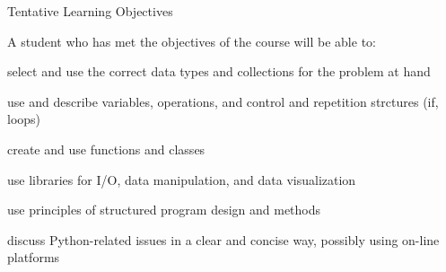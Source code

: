 \documentclass{beamer}%
\begin{document}
\begin{frame}{Tentative Learning Objectives}


A student who has met the objectives of the course will be able to:
\begin{itemize}
{\footnotesize
\item select and use the correct data types and collections for the problem at hand
\item use and describe variables, operations, and control and repetition strctures (if, loops)
\item create and use functions and classes %
\item use libraries for I/O, data manipulation, and data visualization
\item use principles of structured program design and methods
\item discuss Python-related issues in a clear and concise way, possibly using on-line platforms
}
\end{itemize}

\end{frame}
\end{document}
